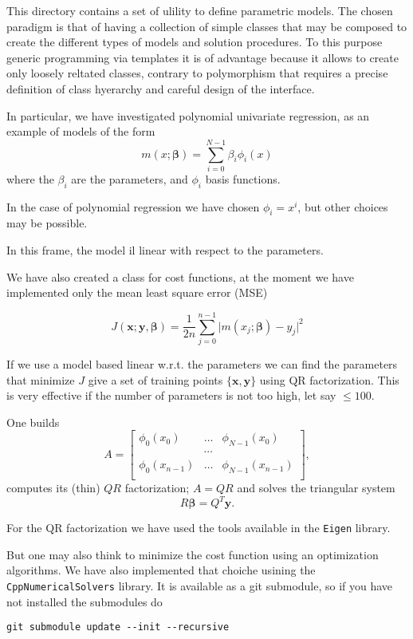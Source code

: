 \documentclass{article}
\begin{document}
This directory contains a set of ulility to define parametric models.
The chosen paradigm is that of having a collection of simple classes that may be composed to 
create the different types of models and solution procedures.
To this purpose generic programming via templates it is of advantage because it allows to create only loosely reltated classes, contrary to 
polymorphism that requires a precise definition of class hyerarchy and careful design of the interface.

In particular, we have investigated polynomial univariate regression, as an example of models of the form
\begin{equation}
m(x;\boldsymbol{\beta})=\sum_{i=0}^{N-1} \beta_i\phi_i(x)
\end{equation}
where the $\beta_i$ are the parameters, and $\phi_i$ basis functions.

In the case of polynomial regression we have chosen $\phi_i=x^i$, but other choices may be possible.

In this frame, the model il linear with respect to the parameters.

We have also created a class for cost functions, at the moment we have implemented only the mean least square error (MSE)

\begin{equation}
J(\mathbf{x};\mathbf{y},\boldsymbol{\beta})=\dfrac{1}{2n}\sum_{j=0}^{n-1}\vert m(x_j;\boldsymbol{\beta})-y_j\vert^2
\end{equation}

If we use a model based linear w.r.t. the parameters we can find the parameters that minimize $J$ give a set of training points $\{\mathbf{x},\mathbf{y}\}$
using QR factorization. This is very effective if the number of parameters is not too high, let say $\le 100$.

One builds
\[
A=\begin{bmatrix}
\phi_0(x_0)&\ldots&\phi_{N-1}(x_{0})\\
&\cdots &\\
\phi_0(x_{n-1})&\ldots&\phi_{N-1}(x_{n-1})\\
\end{bmatrix},
\]
computes its (thin) $QR$ factorization; $A=QR$ and solves the triangular system
\[
R\boldsymbol{\beta}=Q^T\mathbf{y}.
\]

For the QR factorization we have used the tools available in the \texttt{Eigen} library.

But one may also think to minimize the cost function using an optimization algorithms.
We have also implemented that choiche usining the \texttt{CppNumericalSolvers} library. It is available as a git submodule, so if you have not installed the submodules
do
\begin{verbatim}
git submodule update --init --recursive
\end{verbatim}
\end{document}
